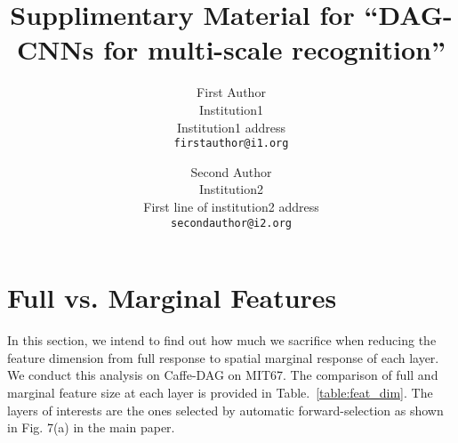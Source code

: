 \documentclass[10pt,twocolumn,letterpaper]{article}
\begin{document}
\title{Supplimentary Material for ``DAG-CNNs for multi-scale recognition''}

\author{First Author\\
Institution1\\
Institution1 address\\
{\tt\small firstauthor@i1.org}
\and
Second Author\\
Institution2\\
First line of institution2 address\\
{\tt\small secondauthor@i2.org}
}

\maketitle

%

\section{Full vs. Marginal Features}

In this section, we intend to find out how much we sacrifice when reducing the feature dimension from full response to spatial marginal response of each layer. We conduct this analysis on Caffe-DAG on MIT67. The comparison of full and marginal feature size at each layer is provided in Table.~\ref{table:feat_dim}. The layers of interests are the ones selected by automatic forward-selection as shown in Fig. 7(a) in the main paper. 
\end{document}
